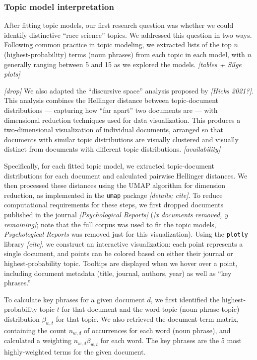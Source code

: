 \documentclass[12pt]{article}
\begin{document}
\hypertarget{topic-model-interpretation}{%
\subsubsection*{Topic model
interpretation}\label{topic-model-interpretation}}

After fitting topic models, our first research question was whether we
could identify distinctive ``race science'' topics. We addressed this
question in two ways. Following common practice in topic modeling, we
extracted lists of the top \(n\) (highest-probability) terms (noun
phrases) from each topic in each model, with \(n\) generally ranging
between 5 and 15 as we explored the models. \emph{{[}tables + Silge
plots{]}}

\emph{{[}drop{]}} We also adapted the ``discursive space'' analysis
proposed by \emph{{[}Hicks 2021?{]}}. This analysis combines the
Hellinger distance between topic-document distributions --- capturing
how ``far apart'' two documents are --- with dimensional reduction
techniques used for data visualization. This produces a two-dimensional
visualization of individual documents, arranged so that documents with
similar topic distributions are visually clustered and visually distinct
from documents with different topic distributions.
\emph{{[}availability{]}}

Specifically, for each fitted topic model, we extracted topic-document
distributions for each document and calculated pairwise Hellinger
distances. We then processed these distances using the UMAP algorithm
for dimension reduction, as implemented in the \texttt{umap} package
\emph{{[}details; cite{]}}. To reduce computational requirements for
these steps, we first dropped documents published in the journal
\emph{{[}Psychological Reports{]}} (\emph{{[}x documents removed, y
remaining{]}}; note that the full corpus was used to fit the topic
models, \emph{Psychological Reports} was removed just for this
visualization). Using the \texttt{plotly} library \emph{{[}cite{]}}, we
construct an interactive visualization: each point represents a single
document, and points can be colored based on either their journal or
highest-probability topic. Tooltips are displayed when we hover over a
point, including document metadata (title, journal, authors, year) as
well as ``key phrases.''

To calculate key phrases for a given document \(d\), we first identified
the highest-probability topic \(t\) for that document and the word-topic
(noun phrase-topic) distribution \(\beta_{w,t}\) for that topic. We also
retrieved the document-term matrix, containing the count \(n_{w,d}\) of
occurrences for each word (noun phrase), and calculated a weighting
\(n_{w,d} \beta_{w,t}\) for each word. The key phrases are the 5 most
highly-weighted terms for the given document.
\end{document}
